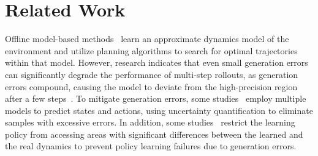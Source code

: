 \section{Related Work}
\noindent
Offline model-based methods~\cite{DBLP:KidambiRNJ20,DBLP:SwazinnaUR21} learn an approximate dynamics model of the environment and utilize planning algorithms to search for optimal trajectories within that model.
However, research indicates that even small generation errors can significantly degrade the performance of multi-step rollouts, as generation errors compound, causing the model to deviate from the high-precision region after a few steps~\cite{DBLP:Talvitie17,DBLP:AsadiML18}.
To mitigate generation errors, some studies~\cite{DBLP:YuTYEZLFM20,DBLP:abs-2111-11097,DBLP:ZhengWXH23} employ multiple models to predict states and actions, using uncertainty quantification to eliminate samples with excessive errors.
In addition, some studies~\cite{chen2022lapo,DBLP:YangJZMS22,DBLP:MaT0M23} restrict the learning policy from accessing areas with significant differences between the learned and the real dynamics to prevent policy learning failures due to generation errors.

